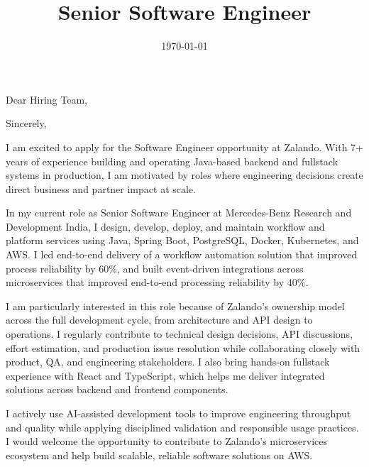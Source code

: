 \documentclass[11pt,a4paper,roman]{moderncv}        %
\title{Senior Software Engineer}
\begin{document}
\date{\today}
\opening{Dear Hiring Team,}
\closing{Sincerely,}
\makelettertitle

I am excited to apply for the Software Engineer opportunity at Zalando. With 7+ years of experience building and operating Java-based backend and fullstack systems in production, I am motivated by roles where engineering decisions create direct business and partner impact at scale.

In my current role as Senior Software Engineer at Mercedes-Benz Research and Development India, I design, develop, deploy, and maintain workflow and platform services using Java, Spring Boot, PostgreSQL, Docker, Kubernetes, and AWS. I led end-to-end delivery of a workflow automation solution that improved process reliability by 60\%, and built event-driven integrations across microservices that improved end-to-end processing reliability by 40\%.

I am particularly interested in this role because of Zalando's ownership model across the full development cycle, from architecture and API design to operations. I regularly contribute to technical design decisions, API discussions, effort estimation, and production issue resolution while collaborating closely with product, QA, and engineering stakeholders. I also bring hands-on fullstack experience with React and TypeScript, which helps me deliver integrated solutions across backend and frontend components.

I actively use AI-assisted development tools to improve engineering throughput and quality while applying disciplined validation and responsible usage practices. I would welcome the opportunity to contribute to Zalando's microservices ecosystem and help build scalable, reliable software solutions on AWS.



\vspace{0.5cm}


\makeletterclosing
\end{document}
